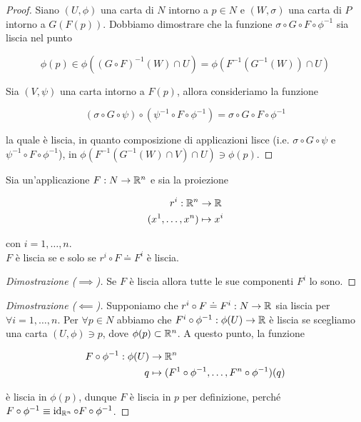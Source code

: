 \begin{proof}
	Siano $ (U,\phi) $ una carta di $ N $ intorno a $ p \in N $ e $ (W,\sigma) $ una carta di $ P $ intorno a $ G(F(p)) $. Dobbiamo dimostrare che la funzione $ \sigma \circ G \circ F \circ \phi^{-1} $ sia liscia nel punto
	
	\begin{equation}
		\phi(p) \in \phi((G \circ F)^{-1}(W) \cap U) = \phi(F^{-1}(G^{-1}(W)) \cap U)
	\end{equation}
	
	Sia $ (V,\psi) $ una carta intorno a $ F(p) $, allora consideriamo la funzione
	
	\begin{equation}
		(\sigma \circ G \circ \psi) \circ (\psi^{-1} \circ F \circ \phi^{-1}) = \sigma \circ G \circ F \circ \phi^{-1}
	\end{equation}

	la quale è liscia, in quanto composizione di applicazioni lisce (i.e. $ \sigma \circ G \circ \psi $ e $ \psi^{-1} \circ F \circ \phi^{-1} $), in $ \phi(F^{-1}(G^{-1}(W) \cap V) \cap U) \ni \phi(p) $.
\end{proof}

\begin{definition}[Componenti]\label{map-comp}
	Sia un'applicazione $ F : N \to \mathbb{R}^{n} $ e sia la proiezione
	
	\begin{align}
		\begin{split}
			r^{i} : \mathbb{R}^{n} &\to \mathbb{R}\\
			(x^{1},\dots,x^{n}) &\mapsto x^{i}
		\end{split}
	\end{align}

	con $ i=1,\dots,n $.\\
	$ F $ è liscia se e solo se $ r^{i} \circ F \doteq F^{i} $ è liscia.
\end{definition}

\begin{proof}[Dimostrazione ($ \implies $)]
	Se $ F $ è liscia allora tutte le sue componenti $ F^{i} $ lo sono.
\end{proof}

\begin{proof}[Dimostrazione ($ \impliedby $)]
	Supponiamo che $ r^{i} \circ F \doteq F^{i} : N \to \mathbb{R} $ sia liscia per $ \forall i=1,\dots,n $. Per $ \forall p \in N $ abbiamo che $ F^{i} \circ \phi^{-1} : \phi(U) \to \mathbb{R} $ è liscia se scegliamo una carta $ (U,\phi) \ni p $, dove $ \phi(p) \subset \mathbb{R}^{n} $. A questo punto, la funzione
	
	\begin{align}
		\begin{split}
			F \circ \phi^{-1} : \phi(U) &\to \mathbb{R}^{n}\\
			q &\mapsto (F^{1} \circ \phi^{-1},\dots,F^{n} \circ \phi^{-1})(q)
		\end{split}
	\end{align}

	è liscia in $ \phi(p) $, dunque $ F $ è liscia in $ p $ per definizione, perché $ F \circ \phi^{-1} \equiv \operatorname{id}_{\mathbb{R}^{n}} \circ F \circ \phi^{-1} $.
\end{proof}

